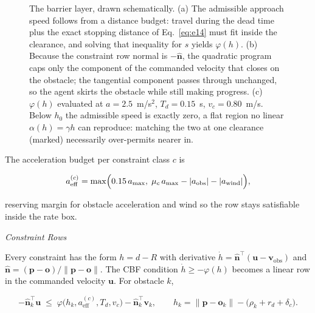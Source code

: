 \documentclass[10pt,letterpaper]{article}
\newcommand{\headingthree}[1]{%
    \par\vspace{6pt}%
    {\centering\fontsize{10}{12}\selectfont\itshape #1\par}%
    \vspace{2pt}\noindent\ignorespaces}
\begin{document}
\begin{figure}[tbp]
    \caption{The barrier layer, drawn schematically. (a) The admissible approach speed follows
        from a distance budget: travel during the dead time plus the exact stopping distance
        of Eq.~\eqref{eq:e14} must fit inside the clearance, and solving that inequality for
        $s$ yields $\varphi(h)$. (b) Because the constraint row normal is $-\hat{\mathbf{n}}$,
        the quadratic program caps only the component of the commanded velocity that closes on
        the obstacle; the tangential component passes through unchanged, so the agent skirts
        the obstacle while still making progress. (c) $\varphi(h)$ evaluated at
        $a=2.5$~m/s$^2$, $T_d=0.15$~s, $v_c=0.80$~m/s. Below $h_0$ the admissible speed is
        exactly zero, a flat region no linear $\alpha(h)=\gamma h$ can reproduce: matching the
        two at one clearance (marked) necessarily over-permits nearer in.}
    \label{fig:barrier}
\end{figure}

The acceleration budget per constraint class $c$ is

\begin{equation}
    \label{eq:e16}
    a_{\mathrm{eff}}^{(c)}=\max\Bigl(0.15\,a_{\max},\;
    \mu_c\,a_{\max}-|a_{\mathrm{obs}}|-|a_{\mathrm{wind}}|\Bigr),
\end{equation}

reserving margin for obstacle acceleration and wind so the row stays satisfiable inside the
rate box.

\headingthree{Constraint Rows}

Every constraint has the form $h=d-R$ with derivative
$\dot h=\hat{\mathbf{n}}^{\!\top}(\mathbf{u}-\mathbf{v}_{\mathrm{obs}})$ and
$\hat{\mathbf{n}}=(\mathbf{p}-\mathbf{o})/\|\mathbf{p}-\mathbf{o}\|$. The CBF condition
$\dot h\ge-\varphi(h)$ becomes a linear row in the commanded velocity $\mathbf{u}$. For
obstacle $k$,

\begin{equation}
    \label{eq:e17}
    -\hat{\mathbf{n}}_k^{\!\top}\mathbf{u}\;\le\;
    \varphi\bigl(h_k,a_{\mathrm{eff}}^{(c)},T_d,v_c\bigr)
    -\hat{\mathbf{n}}_k^{\!\top}\mathbf{v}_k,
    \qquad
    h_k=\|\mathbf{p}-\mathbf{o}_k\|-\bigl(\rho_k+r_d+\delta_c\bigr).
\end{equation}
\end{document}
